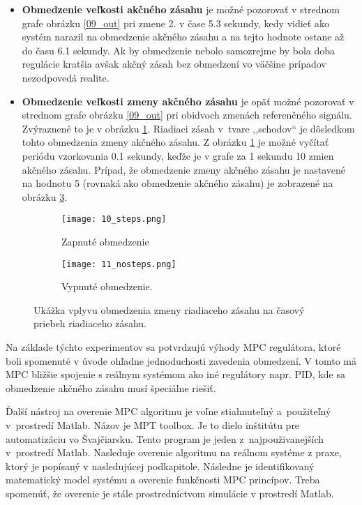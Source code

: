 \begin{itemize}
  \item \textbf{Obmedzenie veľkosti akčného zásahu} je možné pozorovať v strednom grafe obrázku \ref{09_out} pri zmene 2. v čase 5.3 sekundy, kedy vidieť ako systém narazil na obmedzenie akčného zásahu a na tejto hodnote ostane až do času 6.1 sekundy. Ak by obmedzenie nebolo samozrejme by bola doba regulácie kratšia avšak akčný zásah bez obmedzení vo väčšine prípadov nezodpovedá realite.
  \item \textbf{Obmedzenie veľkosti zmeny akčného zásahu} je opäť možné pozorovať v strednom grafe obrázku \ref{09_out} pri obidvoch zmenách referenčného signálu. Zvýraznené to je v obrázku \ref{10_steps}. Riadiaci zásah v~tvare ,,schodov`` je dôsledkom tohto obmedzenia zmeny akčného zásahu. Z obrázku \ref{10_steps} je možné vyčítať periódu vzorkovania 0.1 sekundy, keďže je v grafe za 1 sekundu 10 zmien akčného zásahu. Prípad, že obmedzenie zmeny akčného zásahu je nastavené na hodnotu 5 (rovnaká ako obmedzenie akčného zásahu) je zobrazené na obrázku \ref{11_nosteps}.
\end{itemize}   


\begin{figure}[!htbp]
\centering
\begin{subfigure}{.5\textwidth}
\texttt{[image: 10\_steps.png]}
\caption{Zapnuté obmedzenie}
\label{10_steps}
\end{subfigure}%
\begin{subfigure}{.5\textwidth}
\texttt{[image: 11\_nosteps.png]}
\caption{Vypnuté obmedzenie.}
\label{11_nosteps}
\end{subfigure}
\caption{Ukážka vplyvu obmedzenia zmeny riadiaceho zásahu na časový priebeh riadiaceho zásahu.}
\end{figure}

Na základe týchto experimentov sa potvrdzujú výhody MPC regulátora, ktoré boli spomenuté v úvode ohľadne jednoduchosti zavedenia obmedzení. V tomto má MPC bližšie spojenie s reálnym systémom ako iné regulátory napr. PID, kde sa obmedzenie akčného zásahu musí špeciálne riešiť.

Ďalší nástroj na overenie MPC algoritmu je voľne stiahnuteľný
a~použiteľný v~prostredí Matlab. Názov je MPT toolbox. Je to dielo
inštitútu pre automatizáciu vo Švajčiarsku. Tento program je jeden
z~najpouživanejších v~prostredí Matlab. Nasleduje overenie algoritmu na reálnom systéme z praxe, ktorý je popísaný v nasledujúcej podkapitole. Následne je identifikovaný matematický model systému a overenie funkčnosti MPC princípov. Treba spomenúť, že overenie je stále prostredníctvom simulácie v prostredí Matlab.

